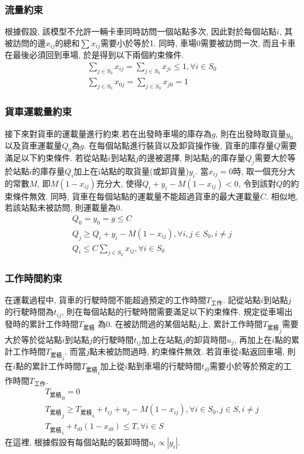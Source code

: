 \subsubsection{流量約束}
根據{\color{red}\Large 假設}, 該模型不允許一輛卡車同時訪問一個站點多次, 因此對於每個站點\(i\), 其被訪問的邊\(x_{ij}\)的總和\(\sum x_{ij}\)需要小於等於1. 同時, 車場\(0\)需要被訪問一次, 而且卡車在最後必須回到車場, 於是得到以下兩個約束條件.
\begin{gather}
\sum_{j\in S_0}x_{ij} = \sum_{j\in S_0}x_{ji} \leqslant 1, \forall i\in S_0\\%
\sum_{j\in S_0}x_{0j} = \sum_{j\in S_0}x_{j0} = 1
\end{gather}
\subsubsection{貨車運載量約束}
接下來對貨車的運載量進行約束.若在出發時車場的庫存為\(g\), 則在出發時取貨量\(y_0\)以及貨車運載量\(Q_0\)為\(g\). 在每個站點進行裝貨以及卸貨操作後, 貨車的庫存量\(Q\)需要滿足以下約束條件. 若從站點\(i\)到站點\(j\)的邊被選擇, 則站點\(j\)的庫存量\(Q_j\)需要大於等於站點\(i\)的庫存量\(Q_i\)加上在i站點的取貨量(或卸貨量)\(y_i\). 當\(x_{ij} = 0\)時, 取一個充分大的常數\(M\), 即\(M(1-x_{ij})\)充分大, 使得\(Q_i + y_i -M(1-x_{ij})<0\), 令到該對\(Q\)的約束條件無效. 同時, 貨車在每個站點的運載量不能超過貨車的最大運載量\(C\). 相似地, 若該站點未被訪問, 則運載量為0.
\begin{gather}
Q_0 = y_0 =g \leqslant C\\
Q_j \geqslant Q_i + y_i - M(1-x_{ij}), \forall i,j\in S_0, i\neq j\\
Q_i \leqslant C\sum_{j\in S_0}x_{ij}, \forall i\in S_0
\end{gather}
\subsubsection{工作時間約束}
在運載過程中, 貨車的行駛時間不能超過預定的工作時間\(T_{工作}\). 記從站點\(i\)到站點\(j\)的行駛時間為\(t_{ij}\), 則在每個站點的行駛時間需要滿足以下約束條件. 規定從車場出發時的累計工作時間\(T_{累積}\) 為0. 在被訪問過的某個站點\(j\)上, 累計工作時間\({T_{累積}}_j \)需要大於等於從站點\(i\)到站點\(j\)的行駛時間\(t_{ij}\)加上在站點\(j\)的卸貨時間\(u_j\), 再加上在\(i\)點的累計工作時間\({T_{累積}}_i\). 而當\(j\)點未被訪問過時, 約束條件無效. 若貨車從\(i\)點返回車場, 則在\(i\)點的累計工作時間\({T_{累積}}_i \)加上從\(i\)點到車場的行駛時間\(t_{i0}\)需要小於等於預定的工作時間\(T_{工作}\).
\begin{gather}
{T_\text{累積}}_0 = 0\\
{T_\text{累積}}_j \geqslant {T_\text{累積}}_i + t_{ij} + u_j -  M(1-x_{ij}), \forall i\in S_0,j\in S, i\neq j\\
{T_\text{累積}}_i + t_{i0}(1-x_{i0}) \leqslant T,\forall i\in S
\end{gather}
在這裡, 根據{\color{red}\Large 假設}有每個站點的裝卸時間\(u_i \propto |y_i|\).

